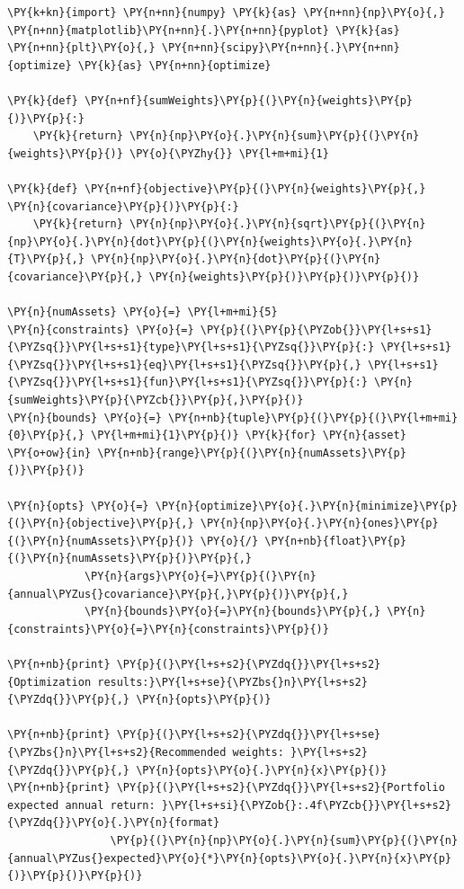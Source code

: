     \begin{tcolorbox}[breakable, size=fbox, boxrule=1pt, pad at break*=1mm,colback=cellbackground, colframe=cellborder]
\begin{Verbatim}[commandchars=\\\{\}]
\PY{k+kn}{import} \PY{n+nn}{numpy} \PY{k}{as} \PY{n+nn}{np}\PY{o}{,} \PY{n+nn}{matplotlib}\PY{n+nn}{.}\PY{n+nn}{pyplot} \PY{k}{as} \PY{n+nn}{plt}\PY{o}{,} \PY{n+nn}{scipy}\PY{n+nn}{.}\PY{n+nn}{optimize} \PY{k}{as} \PY{n+nn}{optimize}

\PY{k}{def} \PY{n+nf}{sumWeights}\PY{p}{(}\PY{n}{weights}\PY{p}{)}\PY{p}{:}
    \PY{k}{return} \PY{n}{np}\PY{o}{.}\PY{n}{sum}\PY{p}{(}\PY{n}{weights}\PY{p}{)} \PY{o}{\PYZhy{}} \PY{l+m+mi}{1}

\PY{k}{def} \PY{n+nf}{objective}\PY{p}{(}\PY{n}{weights}\PY{p}{,} \PY{n}{covariance}\PY{p}{)}\PY{p}{:}
    \PY{k}{return} \PY{n}{np}\PY{o}{.}\PY{n}{sqrt}\PY{p}{(}\PY{n}{np}\PY{o}{.}\PY{n}{dot}\PY{p}{(}\PY{n}{weights}\PY{o}{.}\PY{n}{T}\PY{p}{,} \PY{n}{np}\PY{o}{.}\PY{n}{dot}\PY{p}{(}\PY{n}{covariance}\PY{p}{,} \PY{n}{weights}\PY{p}{)}\PY{p}{)}\PY{p}{)}

\PY{n}{numAssets} \PY{o}{=} \PY{l+m+mi}{5}
\PY{n}{constraints} \PY{o}{=} \PY{p}{(}\PY{p}{\PYZob{}}\PY{l+s+s1}{\PYZsq{}}\PY{l+s+s1}{type}\PY{l+s+s1}{\PYZsq{}}\PY{p}{:} \PY{l+s+s1}{\PYZsq{}}\PY{l+s+s1}{eq}\PY{l+s+s1}{\PYZsq{}}\PY{p}{,} \PY{l+s+s1}{\PYZsq{}}\PY{l+s+s1}{fun}\PY{l+s+s1}{\PYZsq{}}\PY{p}{:} \PY{n}{sumWeights}\PY{p}{\PYZcb{}}\PY{p}{,}\PY{p}{)}
\PY{n}{bounds} \PY{o}{=} \PY{n+nb}{tuple}\PY{p}{(}\PY{p}{(}\PY{l+m+mi}{0}\PY{p}{,} \PY{l+m+mi}{1}\PY{p}{)} \PY{k}{for} \PY{n}{asset} \PY{o+ow}{in} \PY{n+nb}{range}\PY{p}{(}\PY{n}{numAssets}\PY{p}{)}\PY{p}{)}

\PY{n}{opts} \PY{o}{=} \PY{n}{optimize}\PY{o}{.}\PY{n}{minimize}\PY{p}{(}\PY{n}{objective}\PY{p}{,} \PY{n}{np}\PY{o}{.}\PY{n}{ones}\PY{p}{(}\PY{n}{numAssets}\PY{p}{)} \PY{o}{/} \PY{n+nb}{float}\PY{p}{(}\PY{n}{numAssets}\PY{p}{)}\PY{p}{,} 
			\PY{n}{args}\PY{o}{=}\PY{p}{(}\PY{n}{annual\PYZus{}covariance}\PY{p}{,}\PY{p}{)}\PY{p}{,} 
			\PY{n}{bounds}\PY{o}{=}\PY{n}{bounds}\PY{p}{,} \PY{n}{constraints}\PY{o}{=}\PY{n}{constraints}\PY{p}{)}

\PY{n+nb}{print} \PY{p}{(}\PY{l+s+s2}{\PYZdq{}}\PY{l+s+s2}{Optimization results:}\PY{l+s+se}{\PYZbs{}n}\PY{l+s+s2}{\PYZdq{}}\PY{p}{,} \PY{n}{opts}\PY{p}{)}

\PY{n+nb}{print} \PY{p}{(}\PY{l+s+s2}{\PYZdq{}}\PY{l+s+se}{\PYZbs{}n}\PY{l+s+s2}{Recommended weights: }\PY{l+s+s2}{\PYZdq{}}\PY{p}{,} \PY{n}{opts}\PY{o}{.}\PY{n}{x}\PY{p}{)}
\PY{n+nb}{print} \PY{p}{(}\PY{l+s+s2}{\PYZdq{}}\PY{l+s+s2}{Portfolio expected annual return: }\PY{l+s+si}{\PYZob{}:.4f\PYZcb{}}\PY{l+s+s2}{\PYZdq{}}\PY{o}{.}\PY{n}{format}
				\PY{p}{(}\PY{n}{np}\PY{o}{.}\PY{n}{sum}\PY{p}{(}\PY{n}{annual\PYZus{}expected}\PY{o}{*}\PY{n}{opts}\PY{o}{.}\PY{n}{x}\PY{p}{)}\PY{p}{)}\PY{p}{)}


\end{Verbatim}
\end{tcolorbox}
